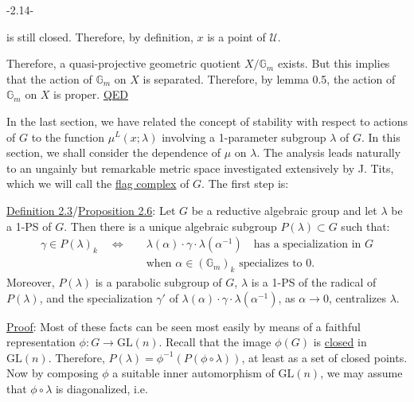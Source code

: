 \begin{center}-2.14-\end{center}

is still closed. Therefore, by definition, $x$ is a point of $\mathcal U$.

Therefore, a quasi-projective geometric quotient $X/\mathbb G_m$ exists. But this implies that the action of $\mathbb G_m$ on $X$ is separated. Therefore, by lemma 0.5, the action of $\mathbb G_m$ on $X$ is proper. \uline{QED}

 In the last section, we have related the concept of stability with respect to actions of $G$ to the function $\mu^L(x;\lambda)$ involving a 1-parameter subgroup $\lambda$ of $G$. In this section, we shall consider the dependence of $\mu$ on $\lambda$. The analysis leads naturally to an ungainly but remarkable metric space investigated extensively by J. Tits, which we will call the \uline{flag complex} of $G$. The first step is:

\uline{Definition 2.3}/\uline{Proposition 2.6}: Let $G$ be a reductive algebraic group and let $\lambda$ be a 1-PS of $G$. Then there is a unique algebraic subgroup $P(\lambda)\subset G$ such that:
\[
\begin{aligned}
\gamma\in P(\lambda)_k\quad\Longleftrightarrow\quad&
\lambda(\alpha)\cdot\gamma\cdot\lambda(\alpha^{-1})\quad\text{has a specialization in }G\\
&\text{when }\alpha\in(\mathbb G_m)_k\text{ specializes to }0.
\end{aligned}
\]
Moreover, $P(\lambda)$ is a parabolic subgroup of $G$, $\lambda$ is a 1-PS of the radical of $P(\lambda)$, and the specialization $\gamma'$ of $\lambda(\alpha)\cdot\gamma\cdot\lambda(\alpha^{-1})$, as $\alpha\longrightarrow0$, centralizes $\lambda$.

\uline{Proof}: Most of these facts can be seen most easily by means of a faithful representation $\phi:G\longrightarrow\mathrm{GL}(n)$. Recall that the image $\phi(G)$ is \uline{closed} in $\mathrm{GL}(n)$. Therefore, $P(\lambda)=\phi^{-1}(P(\phi\circ\lambda))$, at least as a set of closed points. Now by composing $\phi$ \deleted{$\unsure{\Rightarrow}$} a suitable inner automorphism of $\mathrm{GL}(n)$, we may assume that $\phi\circ\lambda$ is diagonalized, i.e.
